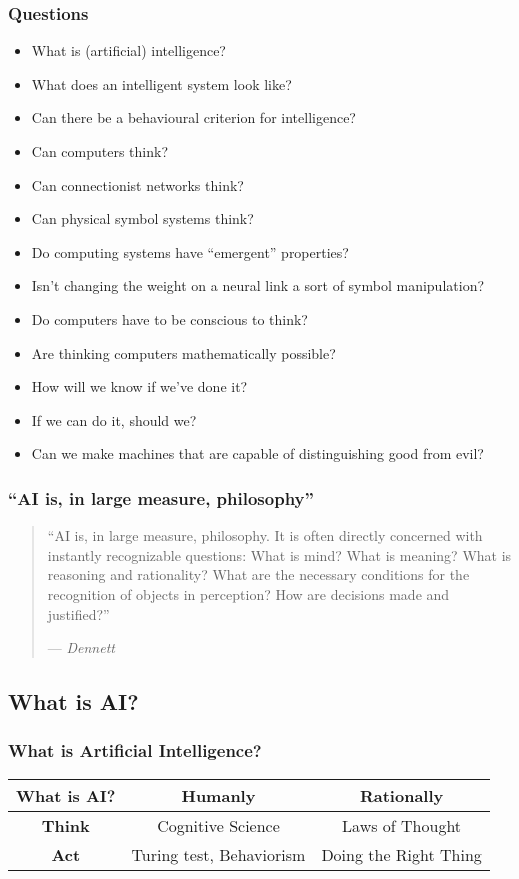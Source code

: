 \documentclass[UTF8,11pt,colorlinks,compress,openany]{beamer}%
\begin{document}
\begin{frame}\frametitle{Questions}
\begin{itemize}
	\item What is (artificial) intelligence?
	\item What does an intelligent system look like?
	\item Can there be a behavioural criterion for intelligence?
	\item Can computers think?
	\item Can connectionist networks think?
	\item Can physical symbol systems think?
	\item Do computing systems have ``emergent'' properties?
	\item Isn't changing the weight on a neural
link a sort of symbol manipulation?
	\item Do computers have to be conscious to think?
	\item Are thinking computers mathematically possible?
	\item How will we know if we've done it?
	\item If we can do it, should we?
	\item Can we make machines that are capable of distinguishing good from evil?
\end{itemize}
\end{frame}

\begin{frame}\frametitle{``AI is, in large measure, philosophy''}
\begin{quote}
``AI is, in large measure, philosophy. It is often directly concerned with instantly recognizable questions: What is mind? What is meaning? What is reasoning and rationality? What are the necessary conditions for the recognition of objects in perception? How are decisions made and justified?''\par
\hfill --- \textsl{Dennett}
\end{quote}
\end{frame}

\subsection{What is AI?}

\begin{frame}\frametitle{What is Artificial Intelligence?}
\begin{table}
\abovetabulinesep=1mm
\belowtabulinesep=1mm
\begin{tabu}{c|c|c}
\hline
\textbf{What is AI?} &\textbf{Humanly} &\textbf{Rationally}\\
\hline
\textbf{Think} &Cognitive Science &Laws of Thought\\
\hline
\textbf{Act} &Turing test, Behaviorism &Doing the Right Thing\\
\hline
\end{tabu}
\end{table}
\end{frame}
\end{document}
